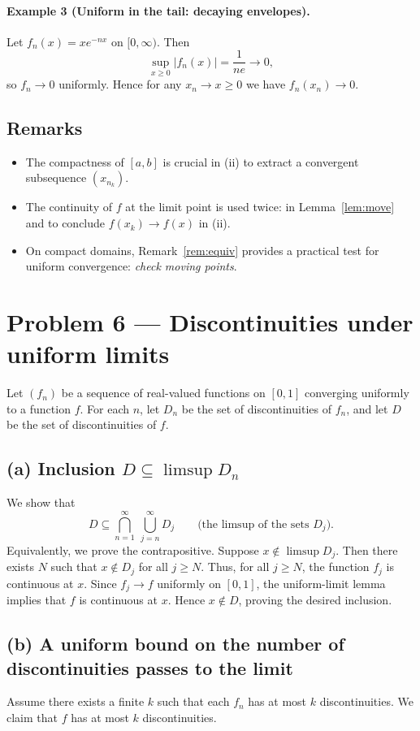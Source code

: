 \documentclass[12pt,a4paper]{article}
\theoremstyle{plain}
\theoremstyle{definition}
\theoremstyle{remark}
\theoremstyle{remark}
\begin{document}
\paragraph{Example 3 (Uniform in the tail: decaying envelopes).}
Let $f_n(x)=x e^{-n x}$ on $[0,\infty)$. Then
\[
\sup_{x\ge 0} |f_n(x)| = \frac{1}{n e}\to 0,
\]
so $f_n\to 0$ uniformly. Hence for any $x_n\to x\ge 0$ we have $f_n(x_n)\to 0$.

\subsection*{Remarks}
\begin{itemize}
	\item The compactness of $[a,b]$ is crucial in (ii) to extract a convergent subsequence $(x_{n_k})$.
	\item The continuity of $f$ at the limit point is used twice: in Lemma~\ref{lem:move} and to conclude $f(x_k)\to f(x)$ in (ii).
	\item On compact domains, Remark~\ref{rem:equiv} provides a practical test for uniform convergence: \emph{check moving points}.
\end{itemize}

\section*{Problem 6 — Discontinuities under uniform limits}

Let $(f_n)$ be a sequence of real-valued functions on $[0,1]$ converging uniformly to a function $f$.
For each $n$, let $D_n$ be the set of discontinuities of $f_n$, and let $D$ be the set of discontinuities of $f$.

\subsection*{(a) Inclusion $D \subseteq \limsup D_n$}
We show that
\[
D \subseteq \bigcap_{n=1}^{\infty}\ \bigcup_{j=n}^{\infty} D_j
\qquad\text{(the limsup of the sets $D_j$).}
\]
Equivalently, we prove the contrapositive. Suppose $x\notin \limsup D_j$. Then there exists $N$ such that
$x\notin D_j$ for all $j\ge N$. Thus, for all $j\ge N$, the function $f_j$ is continuous at $x$.
Since $f_j \to f$ uniformly on $[0,1]$, the uniform-limit lemma implies that $f$ is continuous at $x$.
Hence $x\notin D$, proving the desired inclusion.

\subsection*{(b) A uniform bound on the number of discontinuities passes to the limit}
Assume there exists a finite $k$ such that each $f_n$ has at most $k$ discontinuities.
We claim that $f$ has at most $k$ discontinuities.
\end{document}
